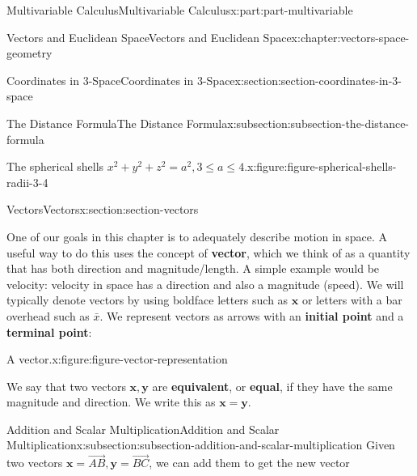 \documentclass[twoside,10pt,]{book}
\newcommand{\terminology}[1]{\textbf{#1}}
\numberwithin{equation}{part}
\begin{document}
\begin{partptx}{Multivariable Calculus}{}{Multivariable Calculus}{}{}{x:part:part-multivariable}
\begin{chapterptx}{Vectors and Euclidean Space}{}{Vectors and Euclidean Space}{}{}{x:chapter:vectors-space-geometry}
\begin{sectionptx}{Coordinates in 3-Space}{}{Coordinates in 3-Space}{}{}{x:section:section-coordinates-in-3-space}
\begin{subsectionptx}{The Distance Formula}{}{The Distance Formula}{}{}{x:subsection:subsection-the-distance-formula}
\begin{figureptx}{The spherical shells \(x^2 + y^2 + z^2 = a^2, 3\leq a\leq 4\).}{x:figure:figure-spherical-shells-radii-3-4}{}
\begin{tcbraster}[raster columns=2, raster column skip=1pt, raster halign=center, raster force size=false, raster left skip=0pt, raster right skip=0pt]
\begin{tcolorbox}[qrstyle]
\end{tcolorbox}%
\end{tcbraster}%
\tcblower
\end{figureptx}%
\end{subsectionptx}
\end{sectionptx}
%
%
\typeout{************************************************}
\typeout{************************************************}
%
\begin{sectionptx}{Vectors}{}{Vectors}{}{}{x:section:section-vectors}
\begin{introduction}{}%
One of our goals in this chapter is to adequately describe motion in space. A useful way to do this uses the concept of \terminology{vector}, which we think of as a quantity that has both direction and magnitude\slash{}length. A simple example would be velocity: velocity in space has a direction and also a magnitude (speed). We will typically denote vectors by using boldface letters such as \(\mathbf{x}\) or letters with a bar overhead such as \(\bar{x}\). We represent vectors as arrows with an \terminology{initial point} and a \terminology{terminal point}:%
\begin{figureptx}{A vector.}{x:figure:figure-vector-representation}{}%
\begin{image}{0.4}{0.2}{0.4}%
%
\end{image}%
\tcblower
\end{figureptx}%
We say that two vectors \(\mathbf{x},\mathbf{y}\) are \terminology{equivalent}, or \terminology{equal}, if they have the same magnitude and direction. We write this as \(\mathbf{x} = \mathbf{y}\).%
\end{introduction}%
%
%
\typeout{************************************************}
\typeout{************************************************}
%
\begin{subsectionptx}{Addition and Scalar Multiplication}{}{Addition and Scalar Multiplication}{}{}{x:subsection:subsection-addition-and-scalar-multiplication}
Given two vectors \(\mathbf{x} = \overrightarrow{AB},\mathbf{y}=\overrightarrow{BC}\), we can add them to get the new vector%
%
\begin{equation*}

\end{equation*}
\end{subsectionptx}
\end{sectionptx}
\end{chapterptx}
\end{partptx}
\end{document}
